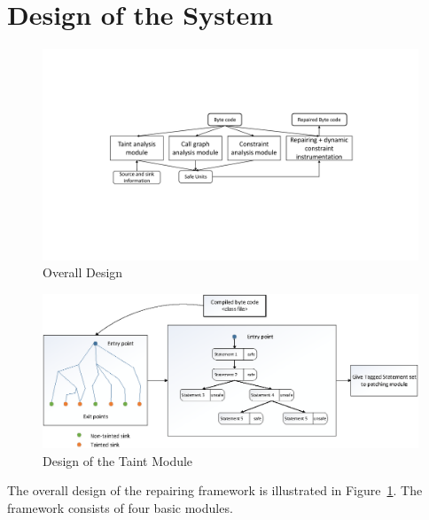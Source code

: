 \section{Design of the System}
\label{sec:design}


\begin{figure}[t]
\centering
\includegraphics[scale=.38]{images/OverallDesign.pdf}
\caption{Overall Design}
\label{fig:overallDesign}
\end{figure}


% 

\begin{figure}[t]
\centering
  \includegraphics[scale= .4]{images/TaintModule.png}
  \caption{Design of the Taint Module}
  \label{fig:TaintModule}
\end{figure}


The overall design of the repairing framework is illustrated in
Figure~\ref{fig:overallDesign}. The framework consists of four basic modules.


